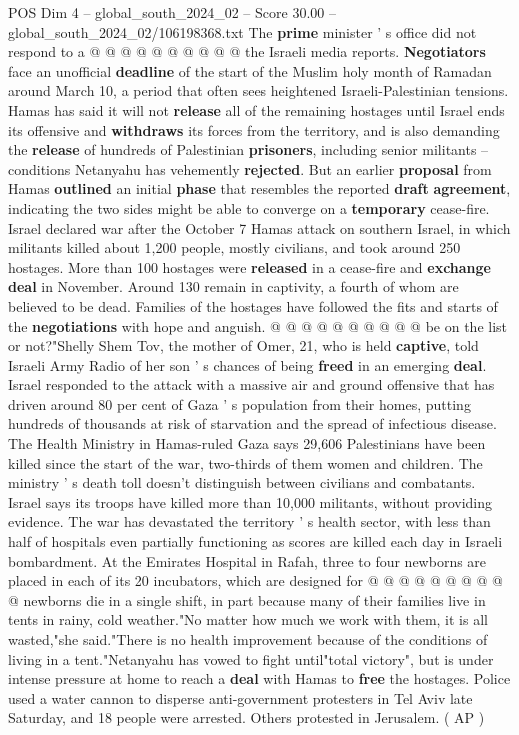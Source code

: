 \begin{textsample}{POS Dim 4 – global\_south\_2024\_02 – Score 30.00 – global\_south\_2024\_02/106198368.txt}
The \textbf{prime} minister ' s office did not respond to a @ @ @ @ @ @ @ @ @ @ the Israeli media reports. \textbf{Negotiators} face an unofficial \textbf{deadline} of the start of the Muslim holy month of Ramadan around March 10, a period that often sees heightened Israeli-Palestinian tensions.
Hamas has said it will not \textbf{release} all of the remaining hostages until Israel ends its offensive and \textbf{withdraws} its forces from the territory, and is also demanding the \textbf{release} of hundreds of Palestinian \textbf{prisoners}, including senior militants -- conditions Netanyahu has vehemently \textbf{rejected}.
But an earlier \textbf{proposal} from Hamas \textbf{outlined} an initial \textbf{phase} that resembles the reported \textbf{draft} \textbf{agreement}, indicating the two sides might be able to converge on a \textbf{temporary} cease-fire.
Israel declared war after the October 7 Hamas attack on southern Israel, in which militants killed about 1,200 people, mostly civilians, and took around 250 hostages.
More than 100 hostages were \textbf{released} in a cease-fire and \textbf{exchange} \textbf{deal} in November.
Around 130 remain in captivity, a fourth of whom are believed to be dead.
Families of the hostages have followed the fits and starts of the \textbf{negotiations} with hope and anguish. @ @ @ @ @ @ @ @ @ @ be on the list or not?"Shelly Shem Tov, the mother of Omer, 21, who is held \textbf{captive}, told Israeli Army Radio of her son ' s chances of being \textbf{freed} in an emerging \textbf{deal}.
Israel responded to the attack with a massive air and ground offensive that has driven around 80 per cent of Gaza ' s population from their homes, putting hundreds of thousands at risk of starvation and the spread of infectious disease.
The Health Ministry in Hamas-ruled Gaza says 29,606 Palestinians have been killed since the start of the war, two-thirds of them women and children.
The ministry ' s death toll doesn't distinguish between civilians and combatants.
Israel says its troops have killed more than 10,000 militants, without providing evidence.
The war has devastated the territory ' s health sector, with less than half of hospitals even partially functioning as scores are killed each day in Israeli bombardment.
At the Emirates Hospital in Rafah, three to four newborns are placed in each of its 20 incubators, which are designed for @ @ @ @ @ @ @ @ @ @ newborns die in a single shift, in part because many of their families live in tents in rainy, cold weather."No matter how much we work with them, it is all wasted,"she said."There is no health improvement because of the conditions of living in a tent."Netanyahu has vowed to fight until"total victory", but is under intense pressure at home to reach a \textbf{deal} with Hamas to \textbf{free} the hostages.
Police used a water cannon to disperse anti-government protesters in Tel Aviv late Saturday, and 18 people were arrested.
Others protested in Jerusalem. ( AP )


\end{textsample}
